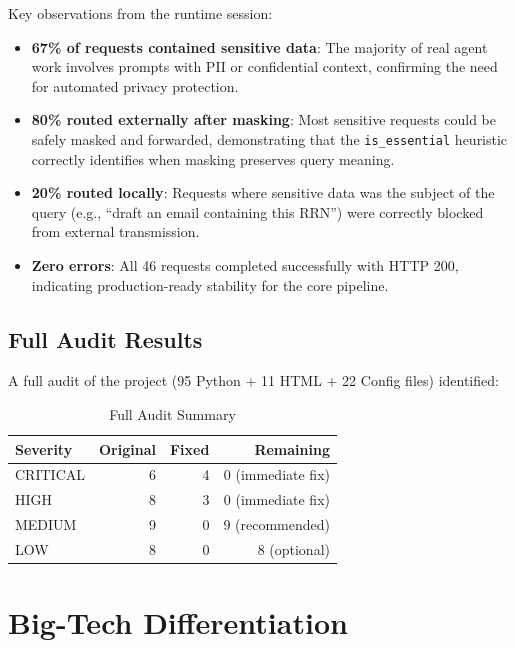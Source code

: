 \documentclass[11pt,a4paper]{article}
\begin{document}
Key observations from the runtime session:

\begin{itemize}[nosep]
  \item \textbf{67\% of requests contained sensitive data}: The majority of real agent work involves prompts with PII or confidential context, confirming the need for automated privacy protection.
  \item \textbf{80\% routed externally after masking}: Most sensitive requests could be safely masked and forwarded, demonstrating that the \texttt{is\_essential} heuristic correctly identifies when masking preserves query meaning.
  \item \textbf{20\% routed locally}: Requests where sensitive data was the subject of the query (e.g., ``draft an email containing this RRN'') were correctly blocked from external transmission.
  \item \textbf{Zero errors}: All 46 requests completed successfully with HTTP 200, indicating production-ready stability for the core pipeline.
\end{itemize}

\subsection{Full Audit Results}

A full audit of the project (95 Python + 11 HTML + 22 Config files) identified:

\begin{table}[h]
\centering
\begin{tabular}{@{}lrrr@{}}
\toprule
Severity & Original & Fixed & Remaining \\
\midrule
CRITICAL & 6 & 4 & 0 (immediate fix) \\
HIGH & 8 & 3 & 0 (immediate fix) \\
MEDIUM & 9 & 0 & 9 (recommended) \\
LOW & 8 & 0 & 8 (optional) \\
\bottomrule
\end{tabular}
\caption{Full Audit Summary}
\end{table}

\section{Big-Tech Differentiation}
\end{document}
